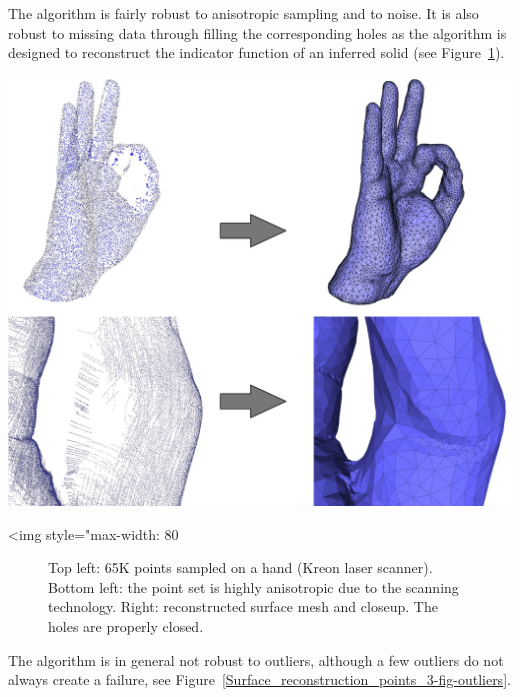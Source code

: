 The algorithm is fairly robust to anisotropic sampling and to noise. It is also robust to missing data through filling the corresponding holes as the algorithm is designed to reconstruct the indicator function of an inferred solid (see Figure~\ref{Surface_reconstruction_points_3-fig-holes_good}).

\begin{center}
    \begin{ccTexOnly}
        \includegraphics[width=1.0\textwidth]{Surface_reconstruction_points_3/holes_good} %
    \end{ccTexOnly}
    \begin{ccHtmlOnly}
        <img style="max-width: 80%
    \end{ccHtmlOnly}
    \begin{figure}[h]
        \caption{Top left: 65K points sampled on a hand (Kreon laser scanner).
                 Bottom left: the point set is highly anisotropic due
                 to the scanning technology.
                 Right: reconstructed surface mesh and closeup.
                 The holes are properly closed.}
        \label{Surface_reconstruction_points_3-fig-holes_good}
    \end{figure}
\end{center}

The algorithm is in general not robust to outliers, although a few outliers do not always create a failure, see Figure~\ref{Surface_reconstruction_points_3-fig-outliers}.

